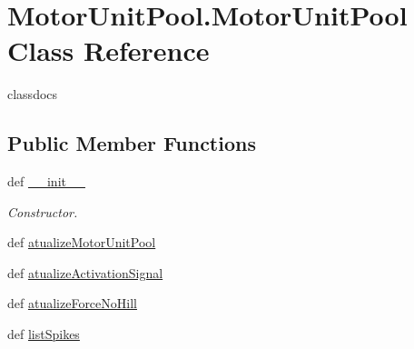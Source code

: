 \hypertarget{class_motor_unit_pool_1_1_motor_unit_pool}{\section{Motor\-Unit\-Pool.\-Motor\-Unit\-Pool Class Reference}
\label{class_motor_unit_pool_1_1_motor_unit_pool}
}


classdocs  


\subsection*{Public Member Functions}
\begin{DoxyCompactItemize}
\item 
def \hyperlink{class_motor_unit_pool_1_1_motor_unit_pool_a627cffa9977225e58194d63a338059dc}{\-\_\-\-\_\-init\-\_\-\-\_\-}
\begin{DoxyCompactList}\small\item\em Constructor. \end{DoxyCompactList}\item 
def \hyperlink{class_motor_unit_pool_1_1_motor_unit_pool_ae525c6bba27837f09d2a767544780b0f}{atualize\-Motor\-Unit\-Pool}
\item 
def \hyperlink{class_motor_unit_pool_1_1_motor_unit_pool_a03b7c1202f680bd8ba3af9b0b06bd71c}{atualize\-Activation\-Signal}
\item 
def \hyperlink{class_motor_unit_pool_1_1_motor_unit_pool_a8fbb182559fe08eb45800271655b711f}{atualize\-Force\-No\-Hill}
\item 
def \hyperlink{class_motor_unit_pool_1_1_motor_unit_pool_a156ffc40be4c7c37f79905fa58b017e5}{list\-Spikes}
\end{DoxyCompactItemize}
